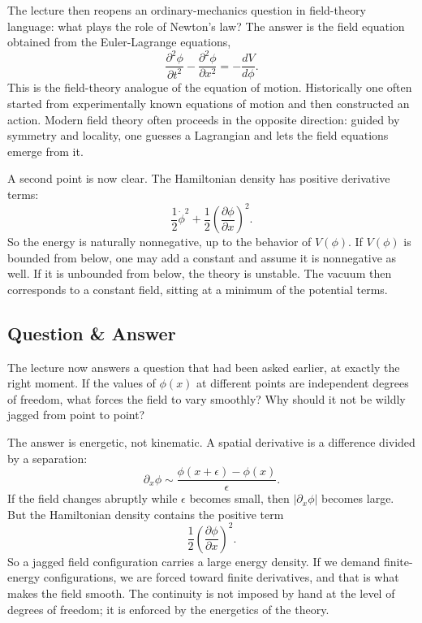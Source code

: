 The lecture then reopens an ordinary-mechanics question in field-theory language: what plays the role of Newton's law? The answer is the field equation obtained from the Euler-Lagrange equations,
\begin{equation}
\frac{\partial^2\phi}{\partial t^2}-\frac{\partial^2\phi}{\partial x^2}
=-\frac{dV}{d\phi}.
\end{equation}
This is the field-theory analogue of the equation of motion. Historically one often started from experimentally known equations of motion and then constructed an action. Modern field theory often proceeds in the opposite direction: guided by symmetry and locality, one guesses a Lagrangian and lets the field equations emerge from it.

A second point is now clear. The Hamiltonian density has positive derivative terms:
\begin{equation}
\frac12\dot\phi^2+\frac12\left(\frac{\partial\phi}{\partial x}\right)^2.
\end{equation}
So the energy is naturally nonnegative, up to the behavior of \(V(\phi)\). If \(V(\phi)\) is bounded from below, one may add a constant and assume it is nonnegative as well. If it is unbounded from below, the theory is unstable. The vacuum then corresponds to a constant field, sitting at a minimum of the potential terms.

\subsection{Question \& Answer}

The lecture now answers a question that had been asked earlier, at exactly the right moment. If the values of \(\phi(x)\) at different points are independent degrees of freedom, what forces the field to vary smoothly? Why should it not be wildly jagged from point to point?

The answer is energetic, not kinematic. A spatial derivative is a difference divided by a separation:
\begin{equation}
\partial_x\phi \sim \frac{\phi(x+\epsilon)-\phi(x)}{\epsilon}.
\end{equation}
If the field changes abruptly while \(\epsilon\) becomes small, then \(|\partial_x\phi|\) becomes large. But the Hamiltonian density contains the positive term
\begin{equation}
\frac12\left(\frac{\partial\phi}{\partial x}\right)^2.
\end{equation}
So a jagged field configuration carries a large energy density. If we demand finite-energy configurations, we are forced toward finite derivatives, and that is what makes the field smooth. The continuity is not imposed by hand at the level of degrees of freedom; it is enforced by the energetics of the theory.

